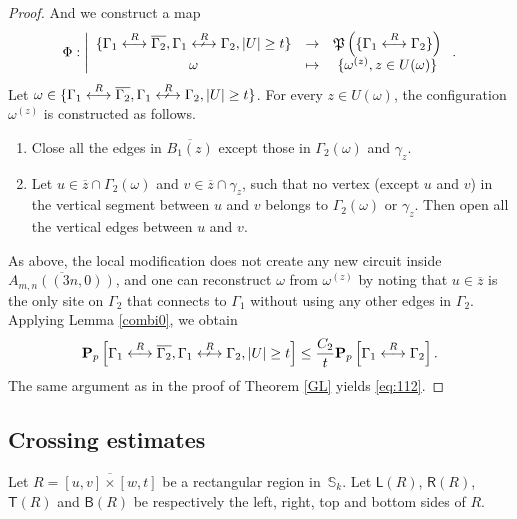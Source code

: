 \documentclass[12pt, twoside,a4paper,reqno]{amsart}
\theoremstyle{plain}
\theoremstyle{remark}
\theoremstyle{definition}
\newcommand{\PP}{\mathbf{P}}
\newcommand{\Pp}[1]{\PP_p \left [ #1 \right ]}
\newcommand{\lr}[1][]{\overset{\:#1\:}\longleftrightarrow}
\newcommand{\nlr}[1][]{\overset{\:#1\:}{\longleftrightarrow}\!\!\!\!\!\!\!\!\!\arrownot
  \ \, \quad}
\newcommand{\ol}{\overline}
\renewcommand{\bar}{\overline}
\begin{document}
\begin{proof}
And we construct a map
 \begin{equation}
   \Phi:  \left \vert
     \begin{array}{ccc}
    \{\Gamma_1 \lr[R]\ol{\Gamma_2}, \Gamma_1\nlr[R] \Gamma_2,
     |U|\ge t\}&\to& \mathfrak P \left(\{\Gamma_1\lr[R] \Gamma_2\} \right)\\
     \omega&\mapsto&\{\omega^{(z)},z\in U(\omega)\}
   \end{array}
   \right..
  \end{equation}
  Let $\omega\in \{\Gamma_1 \lr[R]\ol{\Gamma_2}, \Gamma_1\nlr[R] \Gamma_2,
  |U|\ge t\}$. For every $z\in U(\omega)$, the configuration $\omega^{(z)}$ is
  constructed as follows.
\begin{enumerate}
\item Close all the edges in $\ol{B_1(z)}$ except those in $\Gamma_2(\omega)$ and
  $\gamma_z$.
\item Let $u \in \bar z\cap \Gamma_2(\omega)$ and $v\in \bar z \cap \gamma_z$, such that
  no vertex (except $u$ and $v$) in the vertical segment between $u$ and $v$
  belongs to $\Gamma_2(\omega)$ or $\gamma_z$. Then open all the vertical edges between
  $u$ and $v$.
\end{enumerate}

As above, the local modification does not create any new circuit inside $\ol{A_{m,n}((3n,0))}$, and one can reconstruct $\omega$ from $\omega^{(z)}$ by noting that $u \in \ol{z}$
is the only site on $\Gamma_2$ that connects to $\Gamma_1$
without using any other edges in $\Gamma_2$. Applying Lemma \ref{combi0}, we obtain
\begin{equation}
    \Pp{\Gamma_1 \lr[R]\ol{\Gamma_2}, \Gamma_1\nlr[R] \Gamma_2, |U|\ge t}\le \frac{C_2}{t} \Pp{\Gamma_1\lr[R] \Gamma_2}.
  \end{equation}
The same argument as in the proof of Theorem \ref{GL} yields  \eqref{eq:112}.

\end{proof}


\subsection{Crossing estimates}

\label{sec:defin-dual-surf}

Let $R=\ol{[u,v]\times[w,t]}$ be a rectangular region in~$\mathbb{S}_k$.  Let $\mathsf{L}(R)$, $\mathsf{R}(R)$, $\mathsf{T}(R)$ and $\mathsf{B}(R)$ be
respectively the left, right, top and bottom sides of $R$.
\end{document}
